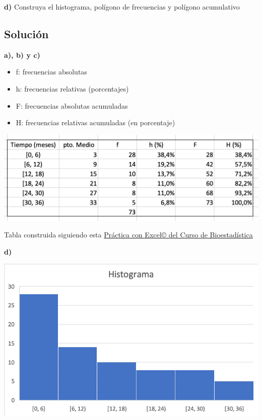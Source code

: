 \documentclass[
]{book}
\providecommand{\tightlist}{%
  \setlength{\itemsep}{0pt}\setlength{\parskip}{0pt}}
\begin{document}
\textbf{d)} Construya el histograma, polígono de frecuencias y polígono acumulativo

\hypertarget{soluciuxf3n-3}{%
\subsection{Solución}\label{soluciuxf3n-3}}

\textbf{a), b) y c)}

\begin{itemize}
\tightlist
\item
  f: frecuencias absolutas
\item
  h: frecuencias relativas (porcentajes)
\item
  F: frecuencias absolutas acumuladas
\item
  H: frecuencias relativas acumuladas (en porcentaje)
\end{itemize}

\includegraphics[width=16.19in]{img/1_2}

Tabla construida siguiendo esta \href{https://1fjmanzano.github.io/bioestadistica/tablas-de-frecuencias.html\#tabla-de-frecuencias-pr\%C3\%A1ctica-con-excel}{Práctica con Excel© del Curso de Bioestadística}

\textbf{d)}

\includegraphics[width=10in]{img/1_3}
\end{document}
